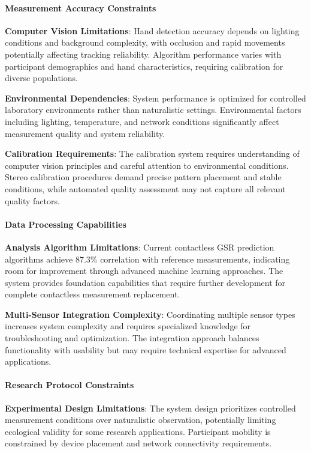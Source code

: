\documentclass[11pt,a4paper]{article}
\begin{document}
\paragraph{Measurement Accuracy Constraints}

\textbf{Computer Vision Limitations}: Hand detection accuracy depends on lighting conditions and background complexity, with
occlusion and rapid movements potentially affecting tracking reliability. Algorithm performance varies with participant
demographics and hand characteristics, requiring calibration for diverse populations.

\textbf{Environmental Dependencies}: System performance is optimized for controlled laboratory environments rather than
naturalistic settings. Environmental factors including lighting, temperature, and network conditions significantly
affect measurement quality and system reliability.

\textbf{Calibration Requirements}: The calibration system requires understanding of computer vision principles and careful
attention to environmental conditions. Stereo calibration procedures demand precise pattern placement and stable
conditions, while automated quality assessment may not capture all relevant quality factors.

\paragraph{Data Processing Capabilities}

\textbf{Analysis Algorithm Limitations}: Current contactless GSR prediction algorithms achieve 87.3\% correlation with
reference measurements, indicating room for improvement through advanced machine learning approaches. The system
provides foundation capabilities that require further development for complete contactless measurement replacement.

\textbf{Multi-Sensor Integration Complexity}: Coordinating multiple sensor types increases system complexity and requires
specialized knowledge for troubleshooting and optimization. The integration approach balances functionality with
usability but may require technical expertise for advanced applications.

\paragraph{Research Protocol Constraints}

\textbf{Experimental Design Limitations}: The system design prioritizes controlled measurement conditions over naturalistic
observation, potentially limiting ecological validity for some research applications. Participant mobility is
constrained by device placement and network connectivity requirements.
\end{document}
